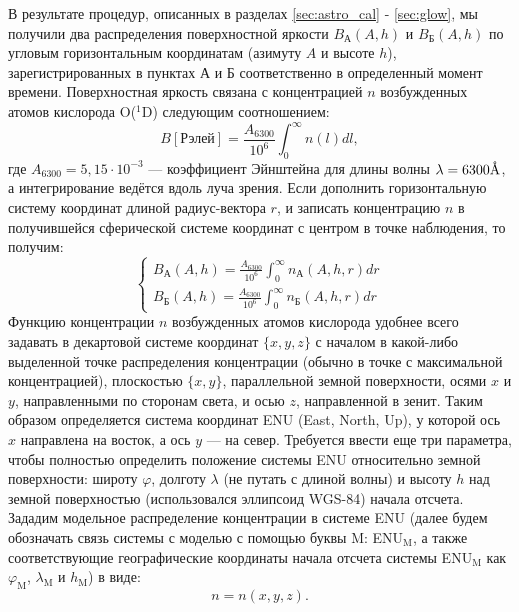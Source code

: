\documentclass[12pt,a4paper]{article}
\newcommand{\angstrom}{\textup{\AA}}
\begin{document}
 В результате процедур, описанных в разделах \ref{sec:astro_cal} - \ref{sec:glow}, мы получили два распределения поверхностной яркости $B_\text{А} (A,h)$ и $B_\text{Б} (A,h)$ по угловым горизонтальным координатам (азимуту $A$ и высоте $h$), зарегистрированных в пунктах А и Б соответственно в определенный момент времени. Поверхностная яркость связана с концентрацией $n$ возбужденных атомов кислорода O($^1$D) следующим соотношением:
 \begin{equation}\label{eq:mod1}
 B [\text{Рэлей}] = \frac{A_{6300}}{10^6}\int_0^\infty n(l)dl,
 \end{equation}
где 
$A_{6300}=5,15\cdot10^{-3}$ %
 \cite{Gustavsson2008} --- коэффициент Эйнштейна для длины волны $\lambda = 6300\angstrom$, а интегрирование ведётся вдоль луча зрения. Если дополнить горизонтальную систему координат длиной радиус-вектора $r$, и записать концентрацию $n$ в получившейся сферической системе координат с центром в точке наблюдения, то получим:
\begin{equation}\label{eq:mod2}
\begin{cases}
 B_\text{А} (A,h) = \frac{A_{6300}}{10^6}\int_0^\infty n_\text{А}(A,h,r)dr\\
 B_\text{Б} (A,h) = \frac{A_{6300}}{10^6}\int_0^\infty n_\text{Б}(A,h,r)dr
 \end{cases}
\end{equation}
Функцию концентрации $n$ возбужденных атомов кислорода удобнее всего задавать в декартовой системе координат $\{x,y,z\}$ с началом в какой-либо выделенной точке распределения концентрации (обычно в точке с максимальной концентрацией), плоскостью $\{x,y\}$, параллельной земной поверхности, осями $x$ и $y$, направленными по сторонам света, и осью $z$, направленной в зенит. Таким образом определяется система координат ENU (East, North, Up), у которой ось $x$ направлена на восток, а ось $y$ --- на север. Требуется ввести еще три параметра, чтобы полностью определить положение системы ENU относительно земной поверхности: широту $\varphi$, долготу $\lambda$ (не путать с длиной волны) и высоту $h$ над земной поверхностью (использовался эллипсоид WGS-84) начала отсчета. Зададим модельное распределение концентрации в системе ENU (далее будем обозначать связь системы с моделью с помощью буквы M: ENU$_\text{M}$, а также соответствующие географические координаты начала отсчета системы ENU$_\text{M}$ как $\varphi_\text{M}$, $\lambda_\text{M}$ и $h_\text{M}$) в виде:
\begin{equation}\label{eq:mod3}
n=n(x,y,z).
\end{equation}
\end{document}

